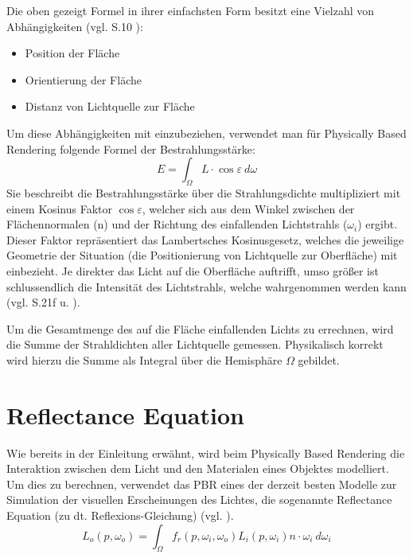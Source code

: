\documentclass[
  11pt,
  a4paper,
  oneside
  ]{article}
\begin{document}
Die oben gezeigt Formel in ihrer einfachsten Form besitzt eine Vielzahl von Abhängig\-keiten (vgl. S.10 \cite{GrundlagenLichtTechnik}):
\begin{itemize}
  \item Position der Fläche
  \item Orientierung der Fläche
  \item Distanz von Lichtquelle zur Fläche
\end{itemize}

Um diese Abhängigkeiten mit einzubeziehen, verwendet man für Physically Based Rendering folgende Formel der Bestrahlungsstärke: 
\begin{equation}\label{eq:bestrahl}
  E=\int _{\Omega }L\cdot \cos \varepsilon \ d\omega
\end{equation}
Sie beschreibt die Bestrahlungsstärke über die Strahlungsdichte multipliziert mit einem Kosinus Faktor $\cos \varepsilon$, welcher sich aus dem Winkel zwischen der Flächennormalen (n) und der Richtung des einfallenden Lichtstrahls ($\omega_{i}$) ergibt. Dieser Faktor repräsentiert das Lambertsches Kosinusgesetz, welches die jeweilige Geometrie der Situation (die Positionierung von Lichtquelle zur Oberfläche) mit einbezieht. Je direkter das Licht auf die Oberfläche auftrifft, umso größer ist schlussendlich die Intensität des Lichtstrahls, welche wahrgenommen werden kann 
(vgl. S.21f \cite{GRAY197813} u. \cite{Ryer97lightmeasurement,renderingEquationArticle}).

Um die Gesamtmenge des auf die Fläche einfallenden Lichts zu errechnen, wird die Summe der Strahldichten aller Lichtquelle gemessen. Physikalisch korrekt wird hierzu die Summe als Integral über die Hemisphäre $\Omega$ gebildet. 
\section{Reflectance Equation}\label{sec:reflac}
Wie bereits in der Einleitung erwähnt, wird beim Physically Based Rendering die Interaktion zwischen dem Licht und den Materialen eines Objektes modelliert. Um dies zu berechnen, verwendet das PBR eines der derzeit besten Modelle zur Simulation der visuellen Erscheinungen des Lichtes, die sogenannte Reflectance Equation (zu dt. Reflexions-Gleichung) 
(vgl. \cite{learnOpenGL}). 
\begin{equation}
  L_{o}\left( p,\omega _{o}\right) =\int _{\Omega }f_{r}\left( p,\omega_{i},\omega_{o}\right)L_{i}\left( p,\omega_{i}\right)n\cdot \omega_{i} \ d\omega_{i}
\end{equation}
\end{document}
